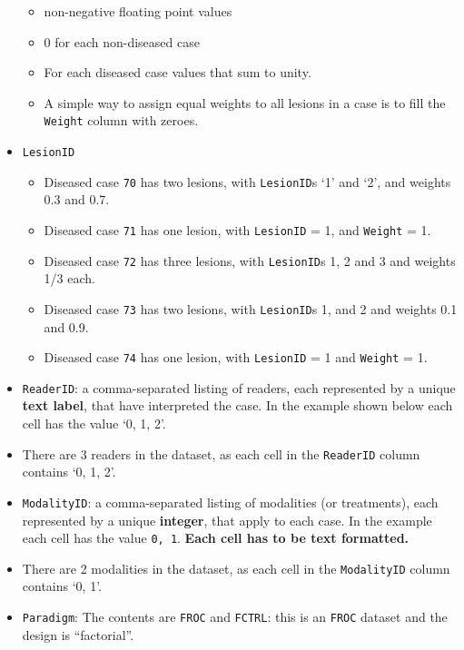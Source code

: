 \documentclass[
]{book}
\providecommand{\tightlist}{%
  \setlength{\itemsep}{0pt}\setlength{\parskip}{0pt}}
\begin{document}
\begin{itemize}
  \begin{itemize}
  \tightlist
  \item
    non-negative floating point values
  \item
    0 for each non-diseased case
  \item
    For each diseased case values that sum to unity.
  \item
    A simple way to assign equal weights to all lesions in a case is to fill the \texttt{Weight} column with zeroes.
  \end{itemize}
\item
  \texttt{LesionID}

  \begin{itemize}
  \tightlist
  \item
    Diseased case \texttt{70} has two lesions, with \texttt{LesionID}s `1' and `2', and weights 0.3 and 0.7.
  \item
    Diseased case \texttt{71} has one lesion, with \texttt{LesionID} = 1, and \texttt{Weight} = 1.
  \item
    Diseased case \texttt{72} has three lesions, with \texttt{LesionID}s 1, 2 and 3 and weights 1/3 each.
  \item
    Diseased case \texttt{73} has two lesions, with \texttt{LesionID}s 1, and 2 and weights 0.1 and 0.9.
  \item
    Diseased case \texttt{74} has one lesion, with \texttt{LesionID} = 1 and \texttt{Weight} = 1.
  \end{itemize}
\item
  \texttt{ReaderID}: a comma-separated listing of readers, each represented by a unique \textbf{text label}, that have interpreted the case. In the example shown below each cell has the value `0, 1, 2'.
\item
  There are 3 readers in the dataset, as each cell in the \texttt{ReaderID} column contains `0, 1, 2'.
\item
  \texttt{ModalityID}: a comma-separated listing of modalities (or treatments), each represented by a unique \textbf{integer}, that apply to each case. In the example each cell has the value \texttt{0,\ 1}. \textbf{Each cell has to be text formatted.}
\item
  There are 2 modalities in the dataset, as each cell in the \texttt{ModalityID} column contains `0, 1'.
\item
  \texttt{Paradigm}: The contents are \texttt{FROC} and \texttt{FCTRL}: this is an \texttt{FROC} dataset and the design is ``factorial''.
\end{itemize}
\end{document}
